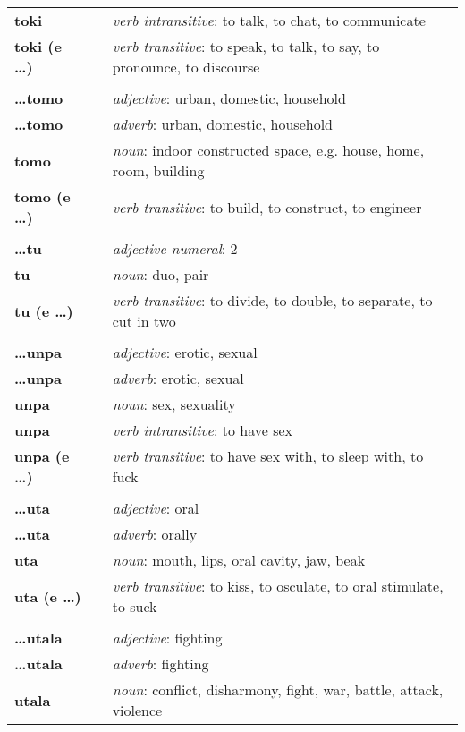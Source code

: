 \begin{supertabular}{p{2,5cm}|ll}
\textbf{toki} && \textit{verb intransitive}: to talk, to chat, to communicate \\ 
\textbf{toki (e \dots)} && \textit{verb transitive}: to speak, to talk, to say, to pronounce, to discourse \\ 
 && \\ %
\textbf{\dots tomo} && \textit{adjective}: urban, domestic, household \\ 
\textbf{\dots tomo} && \textit{adverb}: urban, domestic, household \\ 
\textbf{tomo} && \textit{noun}: indoor constructed space, e.g. house, home, room, building \\ 
\textbf{tomo (e \dots)} && \textit{verb transitive}: to build, to construct, to engineer \\ 
 && \\ %
\textbf{\dots tu} && \textit{adjective numeral}: 2 \\ 
\textbf{tu} && \textit{noun}: duo, pair \\ 
\textbf{tu (e \dots)} && \textit{verb transitive}: to divide, to double, to separate, to cut in two \\ 
 && \\ %
\textbf{\dots unpa} && \textit{adjective}: erotic, sexual \\ 
\textbf{\dots unpa} && \textit{adverb}: erotic, sexual \\ 
\textbf{unpa} && \textit{noun}: sex, sexuality \\ 
\textbf{unpa} && \textit{verb intransitive}: to have sex \\ 
\textbf{unpa (e \dots)} && \textit{verb transitive}: to have sex with, to sleep with, to fuck \\ 
 && \\ %
\textbf{\dots uta} && \textit{adjective}: oral \\ 
\textbf{\dots uta} && \textit{adverb}: orally \\ 
\textbf{uta} && \textit{noun}: mouth, lips, oral cavity, jaw, beak \\ 
\textbf{uta (e \dots)} && \textit{verb transitive}: to kiss, to osculate, to oral stimulate, to suck \\ 
 && \\ %
\textbf{\dots utala} && \textit{adjective}: fighting \\ 
\textbf{\dots utala} && \textit{adverb}: fighting \\ 
\textbf{utala} && \textit{noun}: conflict, disharmony, fight, war, battle, attack, violence \\ 

\end{supertabular}
